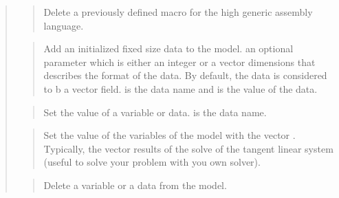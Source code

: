 \documentclass[a4paper,11pt,english]{sphinxmanual}
\begin{document}
\begin{quote}
\sphinxAtStartPar
{}
\begin{quote}

\sphinxAtStartPar
Delete a previously defined macro for the high generic assembly language.
\end{quote}

\sphinxAtStartPar
{}
\begin{quote}

\sphinxAtStartPar
Add an initialized fixed size data to the model.  an
optional parameter which is either an
integer  or a vector dimensions that describes the format of the
data. By default, the data is considered to b a vector field.
 is the data name and  is the value of the data.
\end{quote}

\sphinxAtStartPar
{}
\begin{quote}

\sphinxAtStartPar
Set the value of a variable or data.  is the data name.
\end{quote}

\sphinxAtStartPar
{}
\begin{quote}

\sphinxAtStartPar
Set the value of the variables of the model with the vector .
Typically, the vector  results of the solve of the tangent
linear system (useful to solve your problem with you own solver).
\end{quote}

\sphinxAtStartPar
{}
\begin{quote}

\sphinxAtStartPar
Delete a variable or a data from the model.
\end{quote}

\sphinxAtStartPar
{}
\begin{quote}


\end{quote}
\end{quote}
\end{document}
